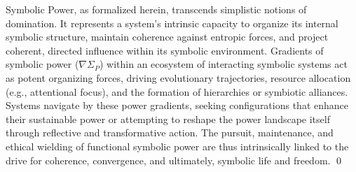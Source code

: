 \begin{scholium}
\label{scholium:bk7_power_organizational_navigational}
Symbolic Power, as formalized herein, transcends simplistic notions of domination. It represents a system's intrinsic capacity to organize its internal symbolic structure, maintain coherence against entropic forces, and project coherent, directed influence within its symbolic environment. Gradients of symbolic power (\(\nabla \Sigma_P\)) within an ecosystem of interacting symbolic systems act as potent organizing forces, driving evolutionary trajectories, resource allocation (e.g., attentional focus), and the formation of hierarchies or symbiotic alliances. Systems navigate by these power gradients, seeking configurations that enhance their sustainable power or attempting to reshape the power landscape itself through reflective and transformative action. The pursuit, maintenance, and ethical wielding of functional symbolic power are thus intrinsically linked to the drive for coherence, convergence, and ultimately, symbolic life and freedom. \qed
\end{scholium}

